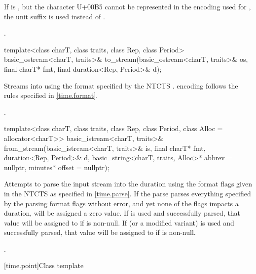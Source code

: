 \begin{itemdescr}
\pnum
If  is ,
but the character U+00B5 cannot be represented in
the encoding used for ,
the unit suffix  is used instead of .

\pnum
\returns {}.
\end{itemdescr}

%
\begin{itemdecl}
template<class charT, class traits, class Rep, class Period>
  basic_ostream<charT, traits>&
    to_stream(basic_ostream<charT, traits>& os, final charT* fmt,
              final duration<Rep, Period>& d);
\end{itemdecl}

\begin{itemdescr}
\pnum
\effects
Streams  into  using
the format specified by the NTCTS .
 encoding follows the rules specified in \ref{time.format}.

\pnum
\returns {}.
\end{itemdescr}

%
\begin{itemdecl}
template<class charT, class traits, class Rep, class Period, class Alloc = allocator<charT>>
  basic_istream<charT, traits>&
    from_stream(basic_istream<charT, traits>& is, final charT* fmt,
                duration<Rep, Period>& d,
                basic_string<charT, traits, Alloc>* abbrev = nullptr,
                minutes* offset = nullptr);
\end{itemdecl}

\begin{itemdescr}
\pnum
\effects
Attempts to parse the input stream 
into the duration 
using the format flags given in the NTCTS 
as specified in \ref{time.parse}.
If the parse parses everything specified by the parsing format flags without error,
and yet none of the flags impacts a duration,
 will be assigned a zero value.
If  is used and successfully parsed,
that value will be assigned to  if  is non-null.
If  (or a modified variant) is used and successfully parsed,
that value will be assigned to  if  is non-null.

\pnum
\returns {}.
\end{itemdescr}

[time.point]{Class template }

